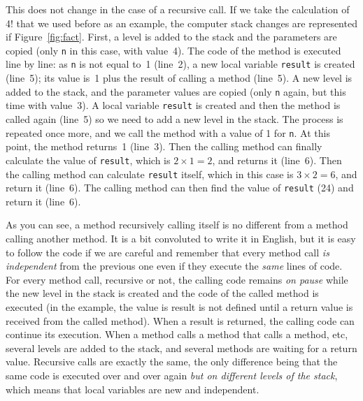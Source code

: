 This does not change in the case of a recursive call. If we take the
calculation of 4! that we used before as an example, 
the computer stack changes are
represented if Figure~\ref{fig:fact}. First, a level is added to the
stack and the parameters are copied (only \verb+n+ in this case, with
value~4). The code of the method is executed line by line: as \verb+n+
is not equal to~1 (line~2), 
a new local variable \verb+result+ is created (line~5); its value
is~1 plus the result of calling a method (line~5). 
A new level is added to the
stack, and the parameter values are copied (only \verb+n+ again, but
this time with value~3). A local variable \verb+result+ is created and
then the method is called again (line~5) 
so we need to add a new level in the
stack. The process is repeated once more, and we call the method with
a value of 1 for \verb+n+. At this point, 
the method returns~1 (line~3). Then
the calling method can finally calculate the value of \verb+result+,
which is $2 \times 1 = 2$, and returns it (line~6). 
Then the calling method can
calculate \verb+result+ itself, which in this case is $3 \times 2 = 6$,
and return it (line~6). The calling method can then find the value of
\verb+result+ (24) and return it (line~6). 

As you can see, a method recursively calling itself is no different
from a method calling another method. It is a bit convoluted to write
it in English, but it is easy to follow the code if we are careful and
remember that every method call \emph{is independent} from the previous one
even if they execute the \emph{same} lines of code. 
For every method call, recursive
or not, the calling code remains \emph{on pause} while the new level
in the stack is created and the code of the called method is
executed (in the example, the value is result is not defined until a
return value is received from the called method). 
When a result is returned, the calling code can continue its
execution. When a method calls a method that calls a method, etc,
several levels are added to the stack, and several methods are waiting
for a return value. Recursive calls are exactly the same, the only
difference being that the same code is executed over and over again
\emph{but on different levels of the stack}, which means that local
variables are new and independent. 

